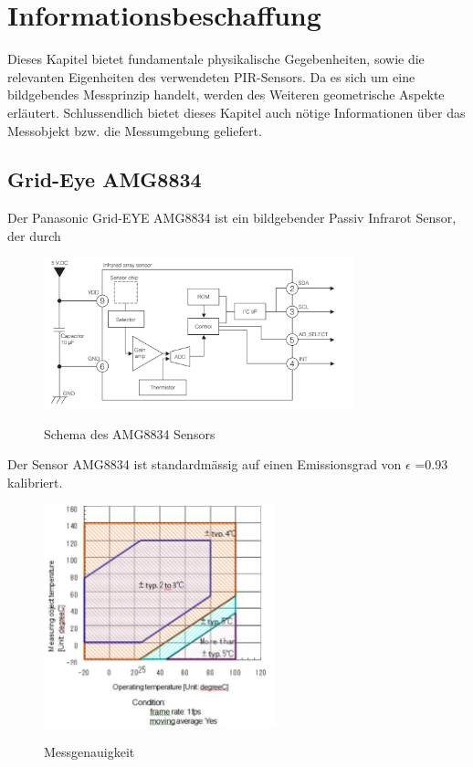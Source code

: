 \chapter{Informationsbeschaffung}
\label{chap:Informationsbeschaffung}
Dieses Kapitel bietet fundamentale physikalische Gegebenheiten, sowie die relevanten Eigenheiten des verwendeten  \ac{PIR}-Sensors. Da es sich um eine bildgebendes Messprinzip handelt, werden des Weiteren geometrische Aspekte erläutert. Schlussendlich bietet dieses Kapitel auch nötige Informationen über das Messobjekt bzw. die Messumgebung geliefert.




\section{Grid-Eye AMG8834}

Der Panasonic Grid-EYE AMG8834 ist ein bildgebender Passiv Infrarot Sensor, der durch 

\begin{figure}[H]
	\centering
	\includegraphics[width=0.8\textwidth]
	{fig/Circuit_AMG8834.PNG}
	\caption[Schema des AMG8834 Sensors]{Schema des AMG8834 Sensors} \protect\cite{AMG8834}
	\label{fig:SchemaAMG8834}
\end{figure}

Der Sensor AMG8834 ist standardmässig auf einen Emissionsgrad von $\epsilon$ =0.93 kalibriert.

\begin{figure}[H]
	\centering
	\includegraphics[width=0.6\textwidth]
	{fig/accuracy.PNG}
	\caption[Messgenauigkeit]{Messgenauigkeit} \protect\cite{AMG8834}
	\label{fig:Temperaturbereich}
\end{figure}

